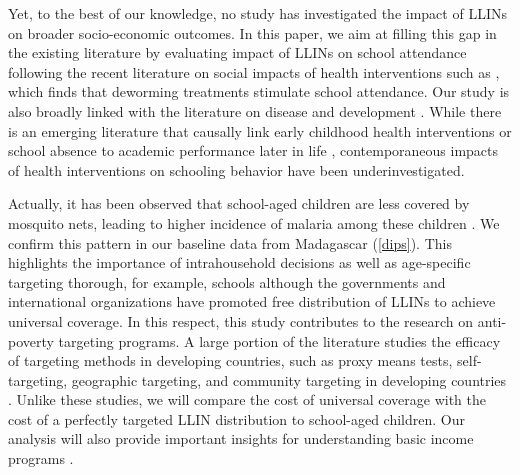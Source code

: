 \documentclass[fleqn,11pt]{article}
\begin{document}
Yet, to the best of our knowledge, no study has investigated the impact of LLINs on broader socio-economic outcomes. In this paper, we aim at filling this gap in the existing literature by evaluating impact of LLINs on school attendance following the recent literature on social impacts of health interventions such as \cite{miguel_worms:_2004}, which finds that deworming treatments stimulate school attendance. Our study is also broadly linked with the literature on disease and development \citep{acemoglu_colonial_2001,bleakley_malaria_2010,almond_is_2006,alsan_effect_2015}. While there is an emerging literature that causally link early childhood health interventions or school absence to academic performance later in life \citep{field_iodine_2009,bharadwaj_early_2013,cattan_long-term_2023}, contemporaneous impacts of health interventions on schooling behavior have been underinvestigated.



Actually, it has been observed that school-aged children are less covered by mosquito nets, leading to higher incidence of malaria among these children \citep{noor_use_2009}. We confirm this pattern in our baseline data from Madagascar (\autoref{dips}). This highlights the importance of intrahousehold decisions as well as age-specific targeting thorough, for example, schools although the governments and international organizations have promoted free distribution of LLINs to achieve universal coverage. In this respect, this study contributes to the research on anti-poverty targeting programs. A large portion of the literature studies the efficacy of targeting methods in developing countries, such as proxy means tests, self-targeting, geographic targeting, and community targeting in developing countries \citep{nichols_targeting_1982,coady_targeting_2004,elbers_poverty_2007,ravallion_how_2009,alatas_targeting_2012,brown_poor_2016}. Unlike these studies, we will compare the cost of universal coverage with the cost of a perfectly targeted LLIN distribution to school-aged children. Our analysis will also provide important insights for understanding basic income programs \citep{ravallion_vox,hanna_universal_2018,banerjee_universal_2019}.
\end{document}
